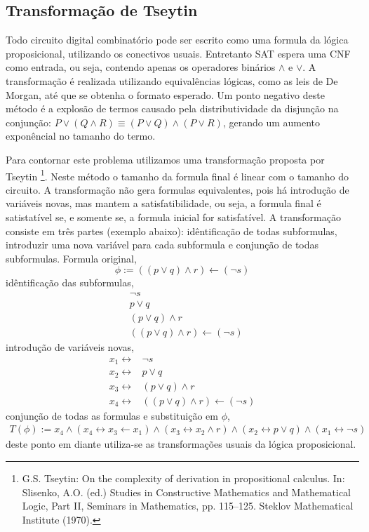 \subsection{Transformação de Tseytin}\label{sec:tseytin}
Todo circuito digital combinatório pode ser escrito como uma formula da lógica proposicional, utilizando
os conectivos usuais. Entretanto SAT espera uma CNF como entrada, ou seja, contendo apenas
os operadores binários $\land$ e $\lor$. A transformação é realizada utilizando equivalências
lógicas, como as leis de De Morgan, até que se obtenha o formato esperado. Um ponto negativo deste
método é a explosão de termos causado pela distributividade da disjunção na conjunção:
$P \lor (Q \land R) \equiv (P \lor Q) \land (P \lor R)$, gerando um aumento exponêncial no tamanho
do termo.

Para contornar este problema utilizamos uma transformação proposta por Tseytin
\footnote{G.S. Tseytin: On the complexity of derivation in propositional calculus. In: Slisenko, A.O. (ed.) Studies in Constructive Mathematics and Mathematical Logic, Part II, Seminars in Mathematics, pp. 115–125. Steklov Mathematical Institute (1970).}. Neste método o tamanho da formula final é linear
com o tamanho do circuito. A transformação não gera formulas equivalentes, pois há introdução
de variáveis novas, mas mantem a satisfatibilidade, ou seja, a formula final é satistatível se, e
somente se, a formula inicial for satisfatível. A transformação consiste em três partes
(exemplo abaixo): idêntificação de todas subformulas, introduzir uma nova variável para cada
subformula e conjunção de todas subformulas. Formula original,
\begin{equation*}
  \phi := ((p \lor q) \land r) \leftarrow (\neg s)
\end{equation*}
idêntificação das subformulas,
\begin{eqnarray*}
  &\neg s \\
  &p \lor q \\
  &(p \lor q) \land r \\
  &((p \lor q) \land r) \leftarrow (\neg s)
\end{eqnarray*}
introdução de variáveis novas,
\begin{eqnarray*}
  x_1 \leftrightarrow& \neg s \\
  x_2 \leftrightarrow& p \lor q \\
  x_3 \leftrightarrow& (p \lor q) \land r \\
  x_4 \leftrightarrow& ((p \lor q) \land r) \leftarrow (\neg s)  
\end{eqnarray*}
conjunção de todas as formulas e substituição em $\phi$,
\begin{eqnarray*}
  T(\phi) := x_4 \land
  (x_4 \leftrightarrow x_3 \leftarrow x_1) \land
  (x_3 \leftrightarrow x_2 \land r ) \land
  (x_2 \leftrightarrow p \lor q) \land
  (x_1 \leftrightarrow \neg s)
\end{eqnarray*}
deste ponto em diante utiliza-se as transformações usuais da lógica proposicional.